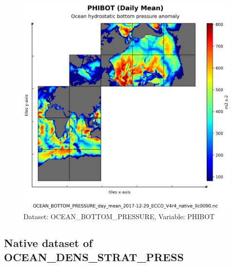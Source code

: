 \begin{figure}[H]
\centering
\includegraphics[scale=0.55]{../images/plots/native_plots/Ocean_Bottom_Pressure/PHIBOT.png}
\caption{Dataset: OCEAN\_BOTTOM\_PRESSURE, Variable: PHIBOT}
\label{tab:table-OCEAN_BOTTOM_PRESSURE_PHIBOT-Plot}
\end{figure}
\subsection{Native dataset of OCEAN\_DENS\_STRAT\_PRESS}
\newp
